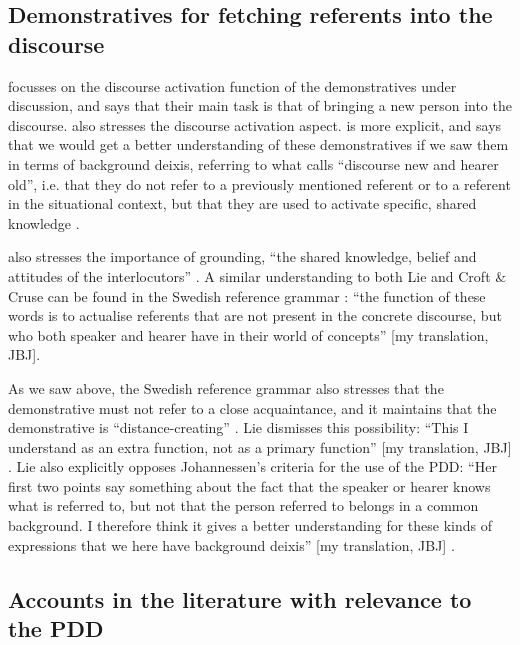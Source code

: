\documentclass[output=paper,colorlinks,citecolor=brown]{langscibook}
\begin{document}
\subsection{Demonstratives for fetching referents into the discourse \citep{Lie2010}}\label{sec:johannessen:2.2}

\citet{Lie2008} focusses on the discourse activation function of the demonstratives under discussion, and says that their main task is that of bringing a new person into the discourse. \citet{Strahan2007} also stresses the discourse activation aspect. \citet{Lie2010} is more explicit, and says that we would get a better understanding of these demonstratives if we saw them in terms of background deixis, referring to what \citet{Diessel1999Book} calls “discourse new and hearer old”, i.e. that they do not refer to a previously mentioned referent or to a referent in the situational context, but that they are used to activate specific, shared knowledge \citep[63]{Lie2010}. 

\citet[63]{Lie2010} also stresses the importance of grounding, “the shared knowledge, belief and attitudes of the interlocutors” \citep[60]{CroftCruse2004}. A similar understanding to both Lie and Croft \& Cruse can be found in the Swedish reference grammar \citep[vol. 2: 317]{TelemanEtAl1999}: “the function of these words is to actualise referents that are not present in the concrete discourse, but who both speaker and hearer have in their world of concepts” [my translation, JBJ]. 

As we saw above, the Swedish reference grammar also stresses that the demonstrative must not refer to a close acquaintance, and it maintains that the demonstrative is “distance-creating” \citep[vol. 2: 317]{TelemanEtAl1999}. Lie dismisses this possibility: “This I understand as an extra function, not as a primary function” [my translation, JBJ] \citep[64]{Lie2010}. Lie also explicitly opposes Johannessen’s criteria for the use of the PDD: “Her first two points say something about the fact that the speaker or hearer knows what is referred to, but not that the person referred to belongs in a common background. I therefore think it gives a better understanding for these kinds of expressions that we here have background deixis” [my translation, JBJ] \citep[70, fn. 15]{Lie2010}.

\subsection{Accounts in the literature with relevance to the PDD}\label{sec:johannessen:2.3}
\end{document}

